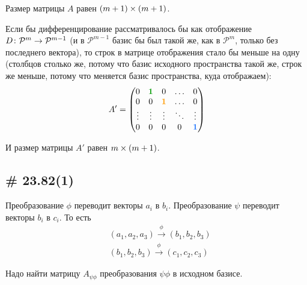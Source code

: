 \documentclass[a4paper,12pt]{article}
\begin{document}
\begin{solution}
    Размер матрицы $A$ равен $(m \hm+ 1) \hm\times (m \hm+ 1)$.
    
    Если бы дифференцирование рассматривалось бы как отображение $D \colon \mathcal P^{m} \hm\to \mathcal P^{m - 1}$ (и в $\mathcal P^{m - 1}$ базис бы был такой же, как в $\mathcal P^{m}$, только без последнего вектора), то строк в матрице отображения стало бы меньше на одну (столбцов столько же, потому что базис исходного пространства такой же, строк же меньше, потому что меняется базис пространства, куда отображаем):
    \[
      A' = \begin{pmatrix}
        0      & \textcolor{green}{\bds 1} & 0                          & \ldots & 0\\
        0      & 0                         & \textcolor{orange}{\bds 1} & \ldots & 0\\
        \vdots & \vdots                    & \vdots                     & \ddots & \vdots\\
        0      & 0                         & 0                          & 0      & \textcolor{blue}{\bds 1}
      \end{pmatrix}
    \]
    
    И размер матрицы $A'$ равен $m \hm\times (m \hm+ 1)$.
  \end{solution}
  
  
  \subsection{\# 23.82(1)}
  
  Преобразование $\phi$ переводит векторы $a_i$ в $b_i$.
  Преобразование $\psi$ переводит векторы $b_i$ в $c_i$.
  То есть
  \[
    \begin{aligned}
      &(a_1, a_2, a_3) \xrightarrow{\phi} (b_1, b_2, b_3)\\
      &(b_1, b_2, b_3) \xrightarrow{\phi} (c_1, c_2, c_3)
    \end{aligned}
  \]
  
  Надо найти матрицу $A_{\psi\phi}$ преобразования $\psi\phi$ в исходном базисе.
  
\end{document}

